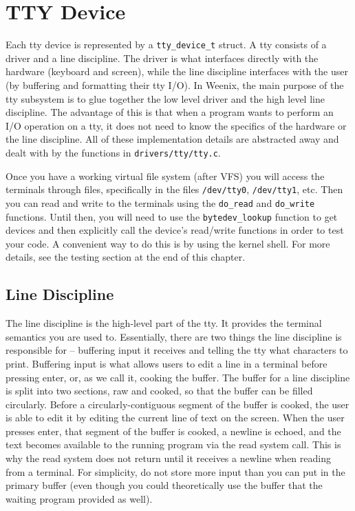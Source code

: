 \section{TTY Device}

Each tty device is represented by a \texttt{tty\_device\_t} struct. A tty consists of a driver and a line discipline. The driver is what interfaces directly with the hardware (keyboard and screen), while the line discipline interfaces with the user (by buffering and formatting their tty I/O). In Weenix, the main purpose of the tty subsystem is to glue together the low level driver and the high level line discipline. The advantage of this is that when a program wants to perform an I/O operation on a tty, it does not need to know the specifics of the hardware or the line discipline. All of these implementation details are abstracted away and dealt with by the functions in \texttt{drivers/tty/tty.c}.

Once you have a working virtual file system (after VFS) you will access the terminals through files, specifically in the files \texttt{/dev/tty0}, \texttt{/dev/tty1}, etc. Then you can read and write to the terminals using the \texttt{do\_read} and \texttt{do\_write} functions. Until then, you will need to use the \texttt{bytedev\_lookup} function to get devices and then explicitly call the device's read/write functions in order to test your code. A convenient way to do this is by using the kernel shell. For more details, see the testing section at the end of this chapter. 

\subsection{Line Discipline}
The line discipline is the high-level part of the tty. It provides the terminal semantics you are used to. Essentially, there are two things the line discipline is responsible for -- buffering input it receives and telling the tty what characters to print. Buffering input is what allows users to edit a line in a terminal before pressing enter, or, as we call it, cooking the buffer. The buffer for a line discipline is split into two sections, raw and cooked, so that the buffer can be filled circularly. Before a circularly-contiguous segment of the buffer is cooked, the user is able to edit it by editing the current line of text on the screen. When the user presses enter, that segment of the buffer is cooked, a newline is echoed, and the text becomes available to the running program via the read system call. This is why the read system does not return until it receives a newline when reading from a terminal. For simplicity, do not store more input than you can put in the primary buffer (even though you could theoretically use the buffer that the waiting program provided as well).

